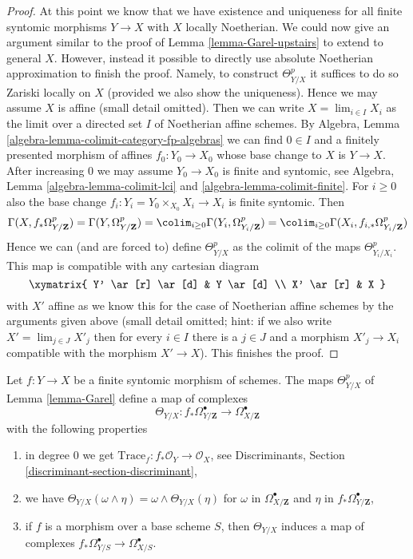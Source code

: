 \begin{proof}
\medskip\noindent
At this point we know that we have existence and uniqueness
for all finite syntomic morphisms $Y \to X$ with $X$ locally Noetherian.
We could now give an argument similar to the proof of
Lemma \ref{lemma-Garel-upstairs} to extend to general $X$.
However, instead it possible to directly use absolute Noetherian approximation
to finish the proof. Namely, to construct $\Theta^p_{Y/X}$
it suffices to do so Zariski locally on $X$ (provided we also
show the uniqueness). Hence we may assume $X$ is affine (small
detail omitted). Then we can write $X = \lim_{i \in I} X_i$
as the limit over a directed set $I$ of Noetherian affine schemes.
By Algebra, Lemma \ref{algebra-lemma-colimit-category-fp-algebras}
we can find $0 \in I$ and a finitely
presented morphism of affines $f_0 : Y_0 \to X_0$ whose base change to
$X$ is $Y \to X$. After increasing $0$ we may assume $Y_0 \to X_0$
is finite and syntomic, see
Algebra, Lemma \ref{algebra-lemma-colimit-lci} and
\ref{algebra-lemma-colimit-finite}. For $i \geq 0$ also the
base change $f_i : Y_i = Y_0 \times_{X_0} X_i \to X_i$ is finite syntomic.
Then
$$
\Gamma(X, f_*\Omega^p_{Y/\mathbf{Z}}) =
\Gamma(Y, \Omega^p_{Y/\mathbf{Z}}) =
\colim_{i \geq 0} \Gamma(Y_i, \Omega^p_{Y_i/\mathbf{Z}}) =
\colim_{i \geq 0} \Gamma(X_i, f_{i, *}\Omega^p_{Y_i/\mathbf{Z}})
$$
Hence we can (and are forced to) define $\Theta^p_{Y/X}$ as the colimit
of the maps $\Theta^p_{Y_i/X_i}$. This map is compatible with any
cartesian diagram
$$
\xymatrix{
Y' \ar[r] \ar[d] & Y \ar[d] \\
X' \ar[r] & X
}
$$
with $X'$ affine as we know this for the case of Noetherian affine schemes
by the arguments given above (small detail omitted; hint: if we also
write $X' = \lim_{j \in J} X'_j$ then for every $i \in I$ there is a $j \in J$
and a morphism $X'_j \to X_i$ compatible with the morphism $X' \to X$).
This finishes the proof.
\end{proof}

\begin{proposition}
\label{proposition-Garel}
\begin{reference}
\cite{Garel}
\end{reference}
Let $f : Y \to X$ be a finite syntomic morphism of schemes.
The maps $\Theta^p_{Y/X}$ of Lemma \ref{lemma-Garel} define a map of complexes
$$
\Theta_{Y/X} :
f_*\Omega^\bullet_{Y/\mathbf{Z}}
\longrightarrow
\Omega^\bullet_{X/\mathbf{Z}}
$$
with the following properties
\begin{enumerate}
\item in degree $0$ we get
$\text{Trace}_f : f_*\mathcal{O}_Y \to \mathcal{O}_X$, see
Discriminants, Section \ref{discriminant-section-discriminant},
\item we have
$\Theta_{Y/X}(\omega \wedge \eta) = \omega \wedge \Theta_{Y/X}(\eta)$
for $\omega$ in $\Omega^\bullet_{X/\mathbf{Z}}$ and $\eta$
in $f_*\Omega^\bullet_{Y/\mathbf{Z}}$,
\item if $f$ is a morphism over a base scheme $S$, then
$\Theta_{Y/X}$ induces a map of complexes
$f_*\Omega^\bullet_{Y/S} \to \Omega^\bullet_{X/S}$.
\end{enumerate}
\end{proposition}

